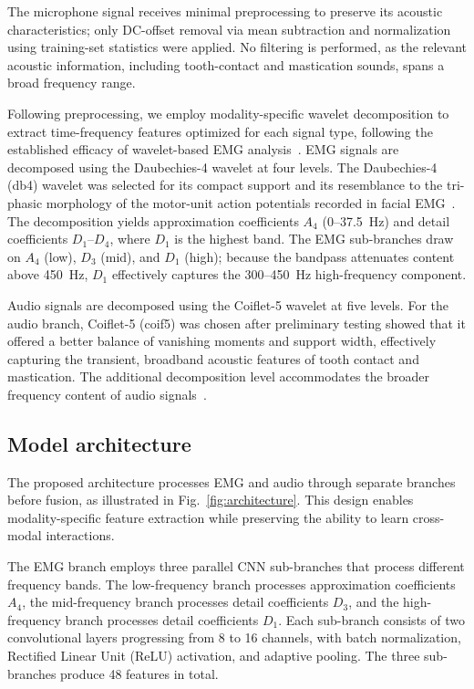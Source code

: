 \documentclass[pdflatex,sn-nature,iicol]{sn-jnl}
\begin{document}
The microphone signal receives minimal preprocessing to preserve its acoustic characteristics; only DC-offset removal via mean subtraction and normalization using training-set statistics were applied. No filtering is performed, as the relevant acoustic information, including tooth-contact and mastication sounds, spans a broad frequency range.

Following preprocessing, we employ modality-specific wavelet decomposition to extract time-frequency features optimized for each signal type, following the established efficacy of wavelet-based EMG analysis~\cite{phinyomark2012feature}. EMG signals are decomposed using the Daubechies-4 wavelet at four levels. The Daubechies-4 (db4) wavelet was selected for its compact support and its resemblance to the tri-phasic morphology of the motor-unit action potentials recorded in facial EMG~\cite{englehart2003robust}. The decomposition yields approximation coefficients $A_4$ (0--37.5~Hz) and detail coefficients $D_1$--$D_4$, where $D_1$ is the highest band. The EMG sub-branches draw on $A_4$ (low), $D_3$ (mid), and $D_1$ (high); because the bandpass attenuates content above 450~Hz, $D_1$ effectively captures the 300--450~Hz high-frequency component.

Audio signals are decomposed using the Coiflet-5 wavelet at five levels. For the audio branch, Coiflet-5 (coif5) was chosen after preliminary testing showed that it offered a better balance of vanishing moments and support width, effectively capturing the transient, broadband acoustic features of tooth contact and mastication. The additional decomposition level accommodates the broader frequency content of audio signals~\cite{bharathi2025unveiling}.

\subsection{Model architecture}

The proposed architecture processes EMG and audio through separate branches before fusion, as illustrated in Fig.~\ref{fig:architecture}. This design enables modality-specific feature extraction while preserving the ability to learn cross-modal interactions.

The EMG branch employs three parallel CNN sub-branches that process different frequency bands. The low-frequency branch processes approximation coefficients $A_4$, the mid-frequency branch processes detail coefficients $D_3$, and the high-frequency branch processes detail coefficients $D_1$. Each sub-branch consists of two convolutional layers progressing from 8 to 16 channels, with batch normalization, Rectified Linear Unit (ReLU) activation, and adaptive pooling. The three sub-branches produce 48 features in total.
\end{document}
